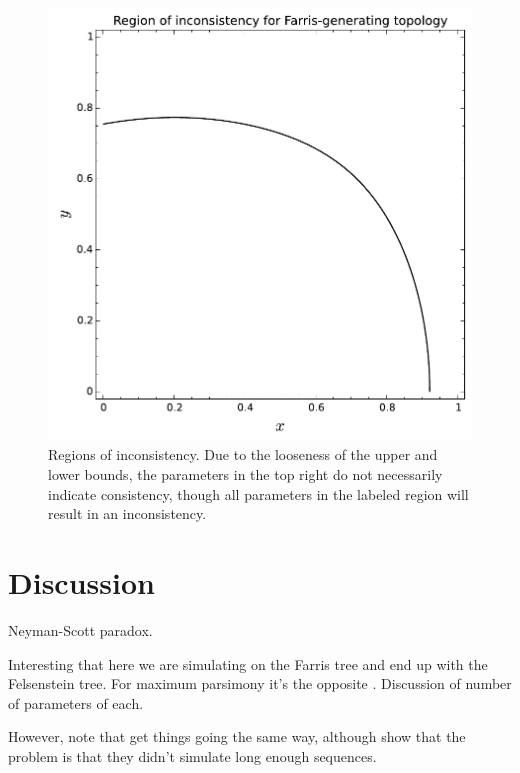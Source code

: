\documentclass[a4paper]{article}
\begin{document}
\begin{figure}
\centering
\includegraphics[width=.9\textwidth]{analytic-inconsistency}
\caption{
    Regions of inconsistency.
    Due to the looseness of the upper and lower bounds, the parameters in the top right do not necessarily indicate consistency, though all parameters in the labeled region will result in an inconsistency.
}
\label{fig:inconsistency-farris}
\end{figure}

\section{Discussion}

Neyman-Scott paradox.

Interesting that here we are simulating on the Farris tree and end up with the Felsenstein tree.
For maximum parsimony it's the opposite \cite{Felsenstein1978-rr}.
Discussion of number of parameters of each.

However, note that \cite{Siddall1998-hq} get things going the same way, although \cite{Swofford2001-hr} show that the problem is that they didn't simulate long enough sequences.





\end{document}

